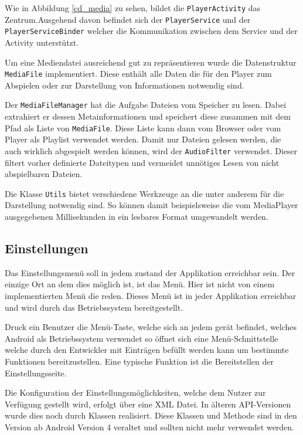 Wie in Abbildung \ref{cd_media} zu sehen, bildet die \verb+PlayerActivity+ das Zentrum.Ausgehend davon befindet sich der \verb+PlayerService+ und der \verb+PlayerServiceBinder+ welcher die Kommunikation zwischen dem Service und der Activity unterstützt.

Um eine Mediendatei ausreichend gut zu repräsentieren wurde die Datenstruktur \verb+MediaFile+ implementiert. Diese enthält alle Daten die für den Player zum Abspielen oder zur Darstellung von Informationen notwendig sind. 

Der \verb+MediaFileManager+ hat die Aufgabe Dateien vom Speicher zu lesen. Dabei extrahiert er dessen Metainformationen und speichert diese zusammen mit dem Pfad als Liste von \verb+MediaFile+. Diese Liste kann dann vom Browser oder vom Player als Playlist verwendet werden. Damit nur Dateien gelesen werden, die auch wirklich abgespielt werden können, wird der \verb+AudioFilter+ verwendet. Dieser filtert vorher definierte Dateitypen und vermeidet unnötiges Lesen von nicht abspielbaren Dateien.

Die Klasse \verb+Utils+ bietet verschiedene Werkzeuge an die unter anderem für die Darstellung notwendig sind. So können damit beispielsweise die vom MediaPlayer ausgegebenen Millisekunden in ein lesbares Format umgewandelt werden.

\subsection{Einstellungen}
Das Einstellungsmenü soll in jedem zustand der Applikation erreichbar sein. Der einzige Ort an dem dies möglich ist, ist das Menü. Hier ist nicht von einem implementierten Menü die reden. Dieses Menü ist in jeder Applikation erreichbar und wird durch das Betriebssystem bereitgestellt.

Druck ein Benutzer die Menü-Taste, welche sich an jedem gerät befindet, welches Android als Betriebssystem verwendet so öffnet sich eine Menü-Schnittstelle welche durch den Entwickler mit Einträgen befüllt werden kann um bestimmte Funktionen bereitzustellen. Eine typische Funktion ist die Bereitstellen der Einstellungsseite.

Die Konfiguration der Einstellungsmöglichkeiten, welche dem Nutzer zur Verfügung gestellt wird, erfolgt über eine XML Datei. In älteren API-Versionen wurde dies noch durch Klassen realisiert. Diese Klassen und Methode sind in den Version ab Android Version 4 veraltet und sollten nicht mehr verwendet werden.

